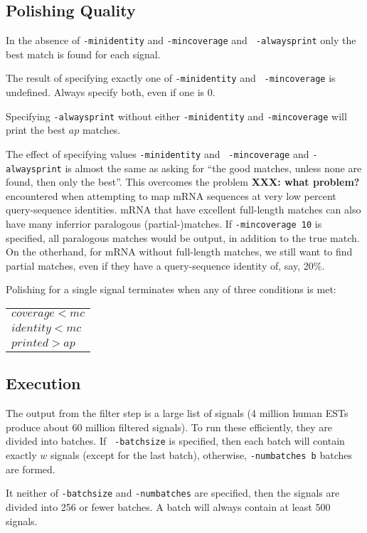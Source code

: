 \documentclass[twoside,11pt]{book}
\begin{document}
\subsection{Polishing Quality}
\label{sec:quality}

In the absence of {\tt -minidentity} and {\tt -mincoverage} and {\tt
-alwaysprint} only the best match is found for each signal.

The result of specifying exactly one of {\tt -minidentity} and {\tt
-mincoverage} is undefined.  Always specify both, even if one is $0$.

Specifying {\tt -alwaysprint} without either {\tt -minidentity} and
{\tt -mincoverage} will print the best $ap$ matches.

The effect of specifying values {\tt -minidentity} and {\tt
-mincoverage} and {\tt -alwaysprint} is almost the same as asking for
``the good matches, unless none are found, then only the best''.  This
overcomes the problem {\bf XXX: what problem?} encountered when attempting to map mRNA
sequences at very low percent query-sequence identities.  mRNA that have
excellent full-length matches can also have many inferrior paralogous
(partial-)matches.  If {\tt -mincoverage 10} is specified, all
paralogous matches would be output, in addition to the true
match.  On the otherhand, for mRNA without full-length matches, we
still want to find partial matches, even if they have a query-sequence
identity of, say, 20\%.

Polishing for a single signal terminates when any of three conditions is met:

\begin{tabular}{l}
$coverage < mc$ \\
$identity < mc$ \\
$printed > ap$
\end{tabular}

\subsection{Execution}

The output from the filter step is a large list of signals (4
million human ESTs produce about 60 million filtered signals).
To run these efficiently, they are divided into batches.  If {\tt
-batchsize} is specified, then each batch will contain exactly $w$
signals (except for the last batch), otherwise, {\tt -numbatches b}
batches are formed.

It neither of {\tt -batchsize} and {\tt -numbatches} are specified,
then the signals are divided into 256 or fewer batches.  A batch will
always contain at least 500 signals.
\end{document}
